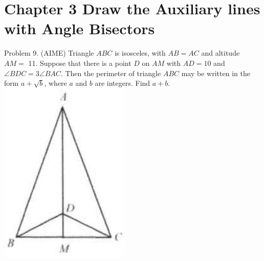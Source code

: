 \documentclass[10pt]{article}
\begin{document}
\section*{Chapter 3 Draw the Auxiliary lines with Angle Bisectors}
Problem 9. (AIME) Triangle \(A B C\) is isosceles, with \(A B=A C\) and altitude \(A M=\) 11. Suppose that there is a point \(D\) on \(A M\) with \(A D=10\) and \(\angle B D C=3 \angle B A C\). Then the perimeter of triangle \(A B C\) may be written in the form \(a+\sqrt{b}\), where \(a\) and \(b\) are integers. Find \(a+b\).\\
\includegraphics[max width=\textwidth, center]{2025_04_17_97bc1f7e44d93c271a88g-066}
\end{document}
